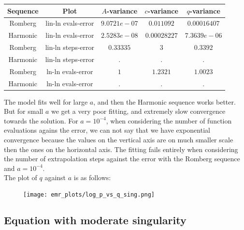 \begin{table}[H]
    \centering
    \begin{tabular}{c|c||c|c|c}
Sequence & Plot & \(A\)-variance & \(c\)-variance & \(q\)-variance\\\hline
Romberg & lin-ln evals-error & \(9.0721e-07\) & \(0.011092\) & \(0.00016407\) \\
Harmonic & lin-ln evals-error & \(2.5283e-08\) & \(0.00028227\) & \(7.3639e-06\) \\
Romberg & lin-ln steps-error & \(0.33335\) & \(3\) & \(0.3392\) \\
Harmonic & lin-ln steps-error & . & . & . \\
Romberg & ln-ln evals-error & \(1\) & \(1.2321\) & \(1.0023\) \\
Harmonic & ln-ln evals-error & . & . & . \\
    \end{tabular}
    \label{tab:my_label}
\end{table}

The model fits well for large \(a\), and then the Harmonic sequence works better. But for small \(a\) we get a very poor fitting, and extremely slow convergence towards the solution. For \(a = 10^{-4}\), when considering the number of function evaluations agains the error, we can not say that we have exponential convergence because the values on the vertical axis are on much smaller scale then the ones on the horizontal axis. The fitting fails entirely when considering the number of extrapolation steps against the error with the Romberg sequence and \(a = 10^{-4}\).\\

The plot of \(q\) against \(a\) is as follows:

\begin{figure}[H]
\centering
\begin{minipage}{0.45\textwidth}
\centering
\texttt{[image: emr\_plots/log\_p\_vs\_q\_sing.png]}
\end{minipage}
\end{figure}

\subsection{Equation with moderate singularity}

